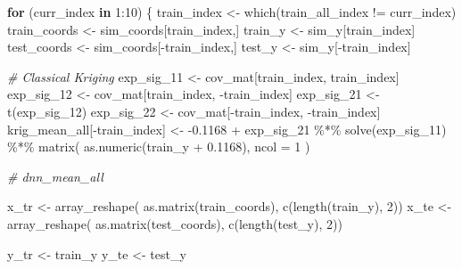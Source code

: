 \documentclass[
]{article}
\newenvironment{Shaded}{\begin{snugshade}}{\end{snugshade}}
\newcommand{\AttributeTok}[1]{\textcolor[rgb]{0.77,0.63,0.00}{#1}}
\newcommand{\CommentTok}[1]{\textcolor[rgb]{0.56,0.35,0.01}{\textit{#1}}}
\newcommand{\ControlFlowTok}[1]{\textcolor[rgb]{0.13,0.29,0.53}{\textbf{#1}}}
\newcommand{\DecValTok}[1]{\textcolor[rgb]{0.00,0.00,0.81}{#1}}
\newcommand{\FloatTok}[1]{\textcolor[rgb]{0.00,0.00,0.81}{#1}}
\newcommand{\FunctionTok}[1]{\textcolor[rgb]{0.00,0.00,0.00}{#1}}
\newcommand{\NormalTok}[1]{#1}
\newcommand{\OtherTok}[1]{\textcolor[rgb]{0.56,0.35,0.01}{#1}}
\newcommand{\SpecialCharTok}[1]{\textcolor[rgb]{0.00,0.00,0.00}{#1}}
\begin{document}
\begin{Shaded}
\begin{Highlighting}[]
\ControlFlowTok{for}\NormalTok{ (curr\_index }\ControlFlowTok{in} \DecValTok{1}\SpecialCharTok{:}\DecValTok{10}\NormalTok{) \{}
\NormalTok{  train\_index }\OtherTok{\textless{}{-}} \FunctionTok{which}\NormalTok{(train\_all\_index }\SpecialCharTok{!=}\NormalTok{ curr\_index)}
\NormalTok{  train\_coords }\OtherTok{\textless{}{-}}\NormalTok{ sim\_coords[train\_index,]}
\NormalTok{  train\_y }\OtherTok{\textless{}{-}}\NormalTok{ sim\_y[train\_index]}
\NormalTok{  test\_coords }\OtherTok{\textless{}{-}}\NormalTok{ sim\_coords[}\SpecialCharTok{{-}}\NormalTok{train\_index,]}
\NormalTok{  test\_y }\OtherTok{\textless{}{-}}\NormalTok{ sim\_y[}\SpecialCharTok{{-}}\NormalTok{train\_index]}

  \CommentTok{\# Classical Kriging}
\NormalTok{  exp\_sig\_11 }\OtherTok{\textless{}{-}}\NormalTok{ cov\_mat[train\_index, train\_index]}
\NormalTok{  exp\_sig\_12 }\OtherTok{\textless{}{-}}\NormalTok{ cov\_mat[train\_index, }\SpecialCharTok{{-}}\NormalTok{train\_index]}
\NormalTok{  exp\_sig\_21 }\OtherTok{\textless{}{-}} \FunctionTok{t}\NormalTok{(exp\_sig\_12)}
\NormalTok{  exp\_sig\_22 }\OtherTok{\textless{}{-}}\NormalTok{ cov\_mat[}\SpecialCharTok{{-}}\NormalTok{train\_index, }\SpecialCharTok{{-}}\NormalTok{train\_index]}
\NormalTok{  krig\_mean\_all[}\SpecialCharTok{{-}}\NormalTok{train\_index] }\OtherTok{\textless{}{-}} \SpecialCharTok{{-}}\FloatTok{0.1168} \SpecialCharTok{+}\NormalTok{ exp\_sig\_21 }\SpecialCharTok{\%*\%} \FunctionTok{solve}\NormalTok{(exp\_sig\_11) }\SpecialCharTok{\%*\%} \FunctionTok{matrix}\NormalTok{( }\FunctionTok{as.numeric}\NormalTok{(train\_y }\SpecialCharTok{+} \FloatTok{0.1168}\NormalTok{), }\AttributeTok{ncol =} \DecValTok{1}\NormalTok{ )}
  
  


\CommentTok{\# dnn\_mean\_all }
 
\NormalTok{  x\_tr }\OtherTok{\textless{}{-}} \FunctionTok{array\_reshape}\NormalTok{( }\FunctionTok{as.matrix}\NormalTok{(train\_coords), }\FunctionTok{c}\NormalTok{(}\FunctionTok{length}\NormalTok{(train\_y), }\DecValTok{2}\NormalTok{))}
\NormalTok{  x\_te }\OtherTok{\textless{}{-}} \FunctionTok{array\_reshape}\NormalTok{( }\FunctionTok{as.matrix}\NormalTok{(test\_coords), }\FunctionTok{c}\NormalTok{(}\FunctionTok{length}\NormalTok{(test\_y), }\DecValTok{2}\NormalTok{)) }

\NormalTok{  y\_tr }\OtherTok{\textless{}{-}}\NormalTok{ train\_y}
\NormalTok{  y\_te }\OtherTok{\textless{}{-}}\NormalTok{ test\_y}
  

\end{Highlighting}
\end{Shaded}
\end{document}
